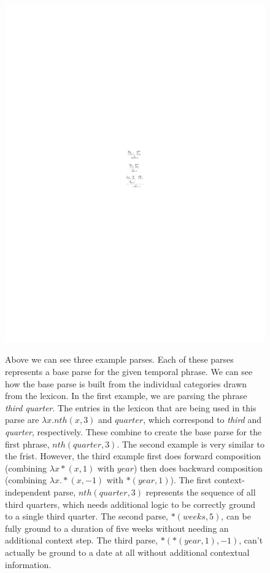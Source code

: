 \begin{figure}[t!]
   \center
   {\includegraphics[width=0.95\columnwidth]{fig/lexiconExample.pdf}}
   \caption{Above we can see three example parses. Each of these parses represents a base parse for the given temporal phrase. We can see how the base parse is built from the individual categories drawn from the lexicon. In the first example, we are parsing the phrase \emph{third quarter}. The entries in the lexicon that are being used in this parse are $\lambda x.nth(x,3)$ and $quarter$, which correspond to \emph{third} and \emph{quarter}, respectively. These combine to create the base parse for the first phrase, $nth(quarter,3)$. 
The second example is very similar to the frist. However, the third example first does forward composition (combining $\lambda x*(x,1)$ with $year$) then does backward composition (combining $\lambda x.*(x,-1)$ with $*(year,1)$). 
The first context-independent parse, $nth(quarter,3)$ represents the sequence of all third quarters, which needs additional logic to be correctly ground to a single third quarter. The second parse, $*(weeks, 5)$, can be fully ground to a duration of five weeks without needing an additional context step. The third parse, $*(*(year,1),-1)$, can't actually be ground to a date at all without additional contextual information. 
   } 
   \label{fig:language-venn}
\end{figure}


